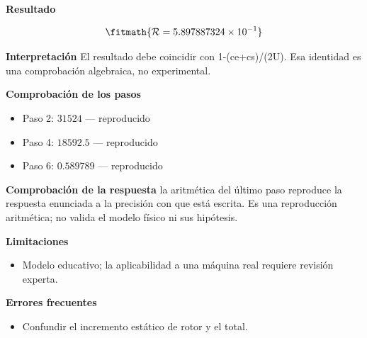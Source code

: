 \documentclass[10pt,openany]{book}
\begin{document}
\begin{tcolorbox}[title={Problema resuelto 4}, studiumworked, breakable]
\noindent\textbf{Resultado}

\[
\fitmath{\mathcal R=5.897887324\times10^{-1}}
\]

\noindent\textbf{Interpretación}
El resultado debe coincidir con 1-(ce+cs)/(2U). Esa identidad es una comprobación algebraica, no experimental.

\noindent\textbf{Comprobación de los pasos}
\begin{itemize}
\item Paso 2: $31524$ — reproducido
\item Paso 4: $18592.5$ — reproducido
\item Paso 6: $0.589789$ — reproducido
\end{itemize}

\noindent\textbf{Comprobación de la respuesta} la aritmética del último paso reproduce la respuesta enunciada a la precisión con que está escrita. Es una reproducción aritmética; no valida el modelo físico ni sus hipótesis.

\noindent\textbf{Limitaciones}
\begin{itemize}
\item Modelo educativo; la aplicabilidad a una máquina real requiere revisión experta.
\end{itemize}

\noindent\textbf{Errores frecuentes}
\begin{itemize}
\item Confundir el incremento estático de rotor y el total.
\end{itemize}
\end{tcolorbox}
\end{document}
